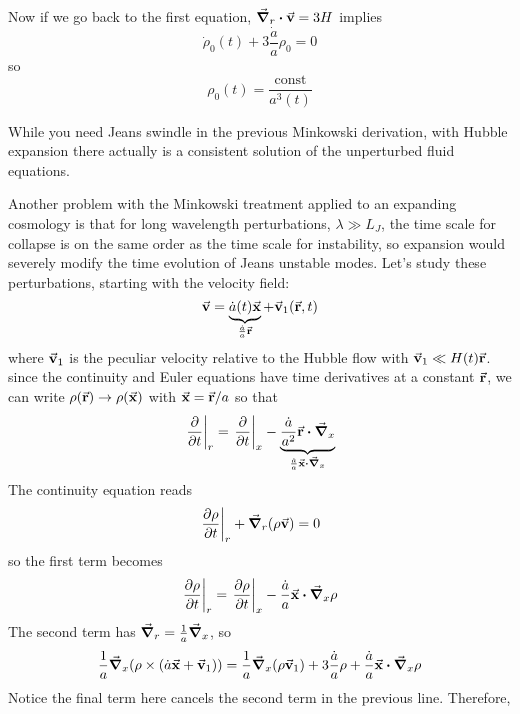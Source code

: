 \documentclass[a4paper,twoside,master.tex]{subfiles}
\begin{document}
Now if we go back to the first equation, $ \grad_r \vdot \va{v} = 3H $ implies
\begin{equation}
    \dot{\rho}_0(t) + 3 \frac{\dot{a}}{a} \rho_0 = 0
\end{equation}
so
\begin{equation}
    \rho_0(t) = \frac{\text{const}}{a^3(t)}
\end{equation}

While you need Jeans swindle in the previous Minkowski derivation, with Hubble expansion there actually is a consistent solution of the unperturbed fluid equations.

Another problem with the Minkowski treatment applied to an expanding cosmology is that for long wavelength perturbations, $ \lambda \gg L_J $, the time scale for collapse is on the same order as the time scale for instability, so expansion would severely modify the time evolution of Jeans unstable modes. Let's study these perturbations, starting with the velocity field:
\begin{equation}
    \va{v} = \underbrace{\dot{a}(t) \va{x}}_{\frac{\dot{a}}{a} \va{r}} + \va{v}_1(\va{r}, t)
\end{equation}
where $ \va{v}_1 $ is the peculiar velocity relative to the Hubble flow with $ \va{v}_1 \ll H(t) \va{r} $. since the continuity and Euler equations have time derivatives at a constant $ \va{r} $, we can write $ \rho(\va{r}) \to \rho(\va{x}) $ with $ \va{x} = \va{r} / a $ so that
\begin{equation}
    \eval{\pdv{t}}_{r} = \eval{\pdv{t}}_{x} - \underbrace{\frac{\dot{a}}{a^2} \va{r} \vdot \grad_x}_{\frac{\dot{a}}{a} \va{x} \vdot \grad_x}
\end{equation}
The continuity equation reads
\begin{equation}
    \eval{\pdv{\rho}{t}}_{r} + \grad_r(\rho \va{v}) = 0
\end{equation}
so the first term becomes
\begin{equation}
    \eval{\pdv{\rho}{t}}_{r} = \eval{\pdv{\rho}{t}}_{x} - \frac{\dot{a}}{a} \va{x} \vdot \grad_x{\rho}
\end{equation}
The second term has $ \grad_r = \frac{1}{a} \grad_x $, so
\begin{equation}
    \frac{1}{a} \grad_x(\rho \times (\dot{a} \va{x} + \va{v}_1)) = \frac{1}{a} \grad_x(\rho \va{v}_1) + 3 \frac{\dot{a}}{a} \rho + \frac{\dot{a}}{a} \va{x} \vdot \grad_x \rho
\end{equation}
Notice the final term here cancels the second term in the previous line. Therefore,
\end{document}
